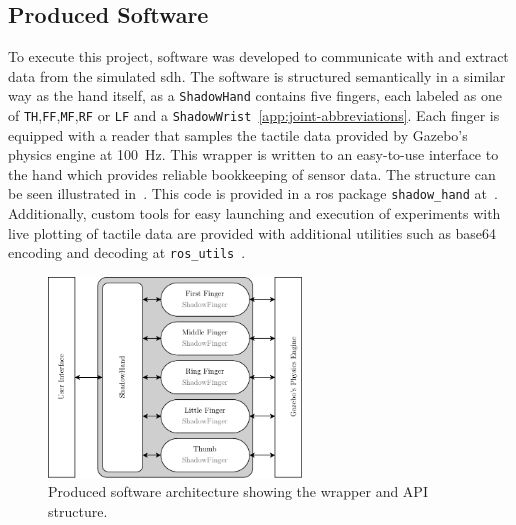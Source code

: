\subsection{Produced Software}\label{sec:system-setup-simulation-setup-produced}

To execute this project, software was developed to communicate with and extract data from the simulated \gls{sdh}. 
The software is structured semantically in a similar way as the hand itself, as a \texttt{ShadowHand} contains five fingers, each labeled as one of \texttt{TH},\texttt{FF},\texttt{MF},\texttt{RF} or \texttt{LF} and a \texttt{ShadowWrist}~\ref{app:joint-abbreviations}. 
Each finger is equipped with a reader that samples the tactile data provided by Gazebo's physics engine at \SI{100}{\hertz}. This wrapper is written to an easy-to-use interface to the hand which provides reliable bookkeeping of sensor data. The structure can be seen illustrated in~.
This code is provided in a \gls{ros} package \texttt{shadow\_hand} at~\cite{in-hand-pose-estimation-repo}. 
Additionally, custom tools for easy launching and execution of experiments with live plotting of tactile data are provided with additional utilities such as base64 encoding and decoding at \texttt{ros\_utils}~\cite{ros-utils-repo}.

\begin{figure}[!h]
	\begin{center}
		\includegraphics[width=0.6\textwidth]{chapters/system-setup/fig/produced-software-diagram(6).pdf}
	\end{center}
	\caption{Produced software architecture showing the wrapper and API structure.}
	\label{fig:produced-software}
\end{figure}
